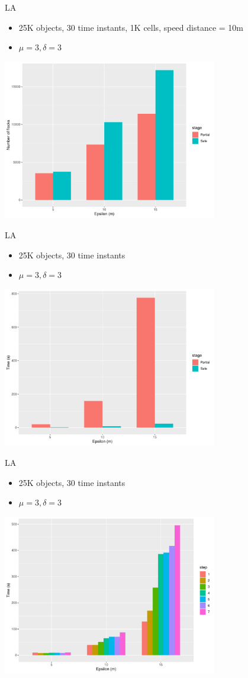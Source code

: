 \documentclass{beamer}
\begin{document}
\begin{frame}{LA}
    \begin{itemize}
        \item 25K objects, 30 time instants, 1K cells, speed distance = 10m
        \item $\mu=3, \delta=3$
    \end{itemize}

    \centering
    \includegraphics[width=0.7\textwidth]{figures/pflock2la25_info}
\end{frame}
\begin{frame}{LA}
    \begin{itemize}
        \item 25K objects, 30 time instants
        \item $\mu=3, \delta=3$
    \end{itemize}

    \centering
    \includegraphics[width=0.7\textwidth]{figures/pflock2la25_time}
\end{frame}
\begin{frame}{LA}
    \begin{itemize}
        \item 25K objects, 30 time instants
        \item $\mu=3, \delta=3$
    \end{itemize}

    \centering
    \includegraphics[width=0.7\textwidth]{figures/pflock3la25_time}
\end{frame}
\end{document}
